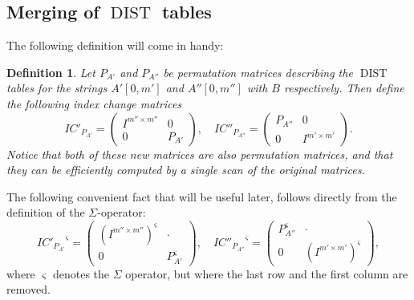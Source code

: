 \documentclass[twoside,11pt,openright]{report}
\newcommand{\DIST}{\operatorname{DIST}}
\newcommand{\str}[3]{#1[#2, #3]}
\newtheorem{mydef}{Definition}
\begin{document}
\subsection{Merging of $\DIST$ tables}
\label{sec:merging-dists}
The following definition will come in handy:
\begin{mydef}
  Let $P_{A'}$ and $P_{A''}$ be permutation matrices describing the $\DIST$ tables for the strings $\str{A'}{0}{m'}$ and $\str{A''}{0}{m''}$ with $B$ respectively. Then define the following index change matrices
  \[
    IC'_{P_{A'}} = \begin{pmatrix}
      I^{m'' \times m''} & 0 \\
      0 & P_{A'}
    \end{pmatrix}, \quad
    IC''_{P_{A''}} = \begin{pmatrix}
      P_{A''} & 0 \\
      0 & I^{m' \times m'}
    \end{pmatrix}.
  \]
  Notice that both of these new matrices are also permutation matrices, and that they can be efficiently computed by a single scan of the original matrices.
\end{mydef}

The following convenient fact that will be useful later, follows directly from the definition of the $\Sigma$-operator:
\[
  {IC'_{P_{A'}}}^{\varsigma} = \begin{pmatrix}
    (I^{m'' \times m''})^{\varsigma} & \cdot \\
    0 & P_{A'}^{\varsigma}
  \end{pmatrix}, \quad
  {IC''_{P_{A''}}}^{\varsigma} = \begin{pmatrix}
    P_{A''}^{\varsigma} & \cdot \\
    0 & (I^{m' \times m'})^{\varsigma}
  \end{pmatrix},
\]
where $\varsigma$ denotes the $\Sigma$ operator, but where the last row and the first column are removed.
\end{document}
